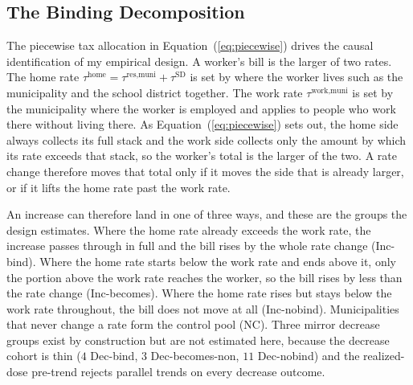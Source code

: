 \documentclass[12pt]{article}
\begin{document}
\subsection{The Binding Decomposition}
\label{sec:theory}
\label{subsec:cells}

The piecewise tax allocation in Equation~(\ref{eq:piecewise}) drives the causal identification of my empirical design. A worker's bill is
the larger of two rates. The home rate
$\tau^{\text{home}} = \tau^{\text{res,muni}} + \tau^{\text{SD}}$ is set by where the worker lives such as the municipality and the school district
together. The work rate $\tau^{\text{work,muni}}$ is set by the
municipality where the worker is employed and applies to people who work
there without living there. As Equation~(\ref{eq:piecewise}) sets out,
the home side always collects its full stack and the work side collects
only the amount by which its rate exceeds that stack, so the worker's
total is the larger of the two. A rate change therefore moves that total
only if it moves the side that is already larger, or if it lifts the home
rate past the work rate.

An increase can therefore land in one of three ways, and these are the
groups the design estimates. Where the home rate already exceeds the work
rate, the increase passes through in full and the bill rises by the whole
rate change (Inc-bind). Where the home rate starts below the work rate
and ends above it, only the portion above the work rate reaches the
worker, so the bill rises by less than the rate change (Inc-becomes).
Where the home rate rises but stays below the work rate throughout, the
bill does not move at all (Inc-nobind). Municipalities
that never change a rate form the control pool (NC). Three mirror
decrease groups exist by construction but are not estimated here, because
the decrease cohort is thin ($4$ Dec-bind, $3$ Dec-becomes-non, $11$
Dec-nobind) and the realized-dose pre-trend rejects parallel trends on
every decrease outcome.
\end{document}
